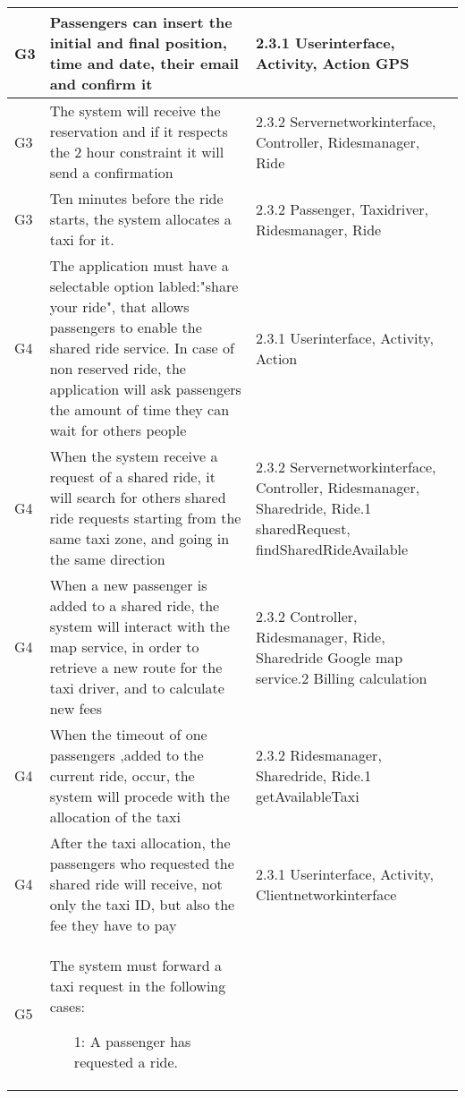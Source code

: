 \begin{center}
\begin{longtable}{| m{2cm} | m{6cm} | m{5cm} | }
    G3& Passengers can insert the initial and final position, time and date, their email and confirm it & 2.3.1 Userinterface, Activity, Action \newline 2.1 GPS\\ \hline
    G3&The system will receive the reservation and if it respects the 2 hour constraint it will send a confirmation & 2.3.2 Servernetworkinterface, Controller, Ridesmanager, Ride \\ \hline
    G3&Ten minutes before the ride starts, the system allocates a taxi for it.  & 2.3.2 Passenger, Taxidriver, Ridesmanager, Ride\\ \hline
    G4&The application must have a selectable option labled:"share your ride", that allows passengers to enable the shared 
	ride service. In case of non reserved ride, the application will ask passengers the amount of time they can wait for others people  & 2.3.1 Userinterface, Activity, Action \\ \hline
    G4& When the system receive a request of a shared ride, it will search for others shared ride requests starting from the same
	taxi zone, and going in the same direction & 2.3.2 Servernetworkinterface, Controller, Ridesmanager, Sharedride, Ride\newline
						      3.2.1 sharedRequest, findSharedRideAvailable\\ \hline
    G4& When a new passenger is added to a shared ride, the system will interact with the map service, in order to 
	retrieve a new route for the taxi driver, and to calculate new fees & 2.3.2 Controller, Ridesmanager, Ride, Sharedride\newline
										2.5 Google map service\newline
										3.2.2 Billing calculation\\ \hline
    G4& When the timeout of one passengers ,added to the current ride, occur, the system will procede with the allocation of the taxi & 2.3.2 Ridesmanager, Sharedride, Ride\newline
																	  3.2.1 getAvailableTaxi\\ \hline
    G4& After the taxi allocation, the passengers who requested the shared ride will receive, not only the taxi ID, but also 
	the fee they have to pay & 2.3.1 Userinterface, Activity, Clientnetworkinterface\\ \hline
    G5& The system must forward a taxi request in the following cases:
	  \begin{itemize}
	   \item [1:] A passenger has requested a ride.

\end{itemize}
\end{longtable}
\end{center}
